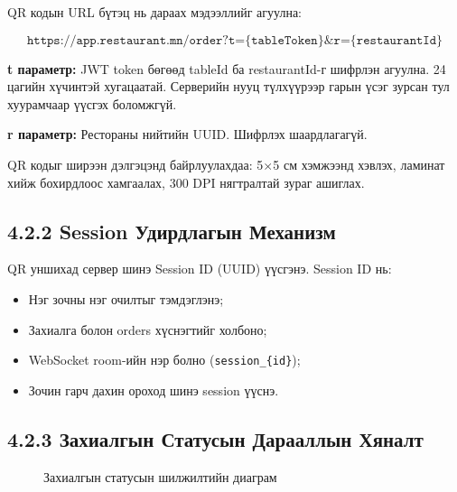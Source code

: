 QR кодын URL бүтэц нь дараах мэдээллийг агуулна:

\begin{equation}
\texttt{https://app.restaurant.mn/order?t=\{tableToken\}\&r=\{restaurantId\}}
\end{equation}

\textbf{t параметр:} JWT token бөгөөд tableId ба restaurantId-г шифрлэн агуулна.
24 цагийн хүчинтэй хугацаатай. Серверийн нууц түлхүүрээр гарын үсэг зурсан тул
хуурамчаар үүсгэх боломжгүй.

\textbf{r параметр:} Рестораны нийтийн UUID. Шифрлэх шаардлагагүй.

QR кодыг ширээн дэлгэцэнд байрлуулахдаа: 5$\times$5 см хэмжээнд хэвлэх,
ламинат хийж бохирдлоос хамгаалах, 300 DPI нягтралтай зураг ашиглах.

\subsection{4.2.2 Session Удирдлагын Механизм}

QR уншихад сервер шинэ Session ID (UUID) үүсгэнэ. Session ID нь:
\begin{itemize}
    \item Нэг зочны нэг очилтыг тэмдэглэнэ;
    \item Захиалга болон orders хүснэгтийг холбоно;
    \item WebSocket room-ийн нэр болно (\texttt{session\_\{id\}});
    \item Зочин гарч дахин ороход шинэ session үүснэ.
\end{itemize}

\subsection{4.2.3 Захиалгын Статусын Дарааллын Хяналт}

\begin{figure}[htbp]
\centering
{}
\caption{Захиалгын статусын шилжилтийн диаграм}
\label{fig:status}
\end{figure}

